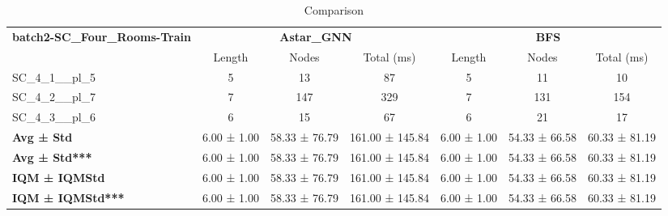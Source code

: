 \begin{table}[!ht]
\centering
\small
\begin{tabular}{l|ccc|ccc}
\multirow{2}{*}{\textbf{batch2-SC\_Four\_Rooms-Train}} & \multicolumn{3}{c|}{\textbf{Astar\_GNN}} & \multicolumn{3}{c}{\textbf{BFS}} \\
\cline{2-7}
& Length & Nodes & Total (ms) & Length & Nodes & Total (ms) \\
\hline
SC\_4\_1\_\_pl\_5 & 5 & 13 & 87 & 5 & 11 & 10 \\
SC\_4\_2\_\_pl\_7 & 7 & 147 & 329 & 7 & 131 & 154 \\
SC\_4\_3\_\_pl\_6 & 6 & 15 & 67 & 6 & 21 & 17 \\
\hline
\textbf{Avg ± Std} & 6.00 ± 1.00 & 58.33 ± 76.79 & 161.00 ± 145.84 & 6.00 ± 1.00 & 54.33 ± 66.58 & 60.33 ± 81.19 \\
\textbf{Avg ± Std***} & 6.00 ± 1.00 & 58.33 ± 76.79 & 161.00 ± 145.84 & 6.00 ± 1.00 & 54.33 ± 66.58 & 60.33 ± 81.19 \\
\textbf{IQM ± IQMStd} & 6.00 ± 1.00 & 58.33 ± 76.79 & 161.00 ± 145.84 & 6.00 ± 1.00 & 54.33 ± 66.58 & 60.33 ± 81.19 \\
\textbf{IQM ± IQMStd***} & 6.00 ± 1.00 & 58.33 ± 76.79 & 161.00 ± 145.84 & 6.00 ± 1.00 & 54.33 ± 66.58 & 60.33 ± 81.19 \\
\end{tabular}
\caption{Comparison}
\label{tab:batch2_SC_Four_Rooms_comparison_train}
\end{table}

